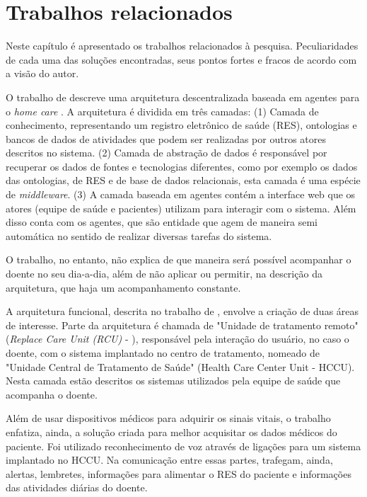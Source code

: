 \chapter{Trabalhos relacionados}\label{cap:trabalhos-relacionados}

Neste capítulo é apresentado os trabalhos relacionados à pesquisa. Peculiaridades
de cada uma das soluções encontradas, seus pontos fortes e fracos de acordo com
a visão do autor.

O trabalho de  descreve uma arquitetura
descentralizada baseada em agentes para o \textit{home care}  . A arquitetura é dividida
em três camadas: (1) Camada de conhecimento, representando um registro
eletrônico de saúde (RES), ontologias e bancos de dados de atividades que podem
ser realizadas por outros atores descritos no sistema. (2) Camada de abstração
de dados é responsável por recuperar os dados de fontes e tecnologias
diferentes, como por exemplo os dados das ontologias, de RES e de base de dados
relacionais, esta camada é uma espécie de \textit{middleware}. (3) A camada baseada em
agentes contém a interface web que os atores (equipe de saúde e pacientes)
utilizam para interagir com o sistema. Além disso conta com os agentes, que são
entidade que agem de maneira semi automática no sentido de realizar diversas
tarefas do sistema. 

O trabalho, no entanto, não explica de que maneira será possível acompanhar o
doente no seu dia-a-dia, além de não aplicar ou permitir, na descrição da
arquitetura, que haja um acompanhamento constante.

A arquitetura funcional, descrita no trabalho de ,
envolve a criação de duas áreas de interesse. Parte da arquitetura é chamada
de "Unidade de tratamento remoto" (\textit{Replace Care Unit (RCU)}     -  ), responsável pela
interação do usuário, no caso o doente, com o sistema implantado no centro de
tratamento, nomeado de "Unidade Central de Tratamento de Saúde" (Health Care
Center Unit - HCCU). Nesta camada estão descritos os sistemas utilizados pela
equipe de saúde que acompanha o doente.

Além de usar dispositivos médicos para adquirir os sinais vitais, o trabalho
enfatiza, ainda, a solução criada para melhor acquisitar os dados médicos do
paciente. Foi utilizado reconhecimento de voz através de ligações para um
sistema implantado no HCCU. Na comunicação entre essas partes, trafegam, ainda,
alertas, lembretes, informações para alimentar o RES do paciente e informações
das atividades diárias do doente.

